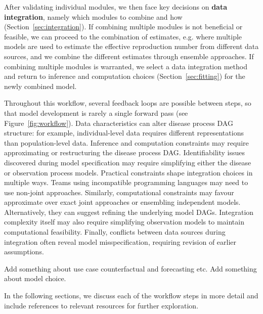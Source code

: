\documentclass{article}
\begin{document}
After validating individual modules, we then face key decisions on \textbf{data integration}, namely which modules to combine and how  (Section~\ref{sec:integration}). If combining multiple modules is not beneficial or feasible, we can proceed to the combination of estimates, e.g. where multiple models are used to estimate the effective reproduction number from different data sources, and we combine the different estimates through ensemble approaches. If combining multiple modules is warranted, we select a data integration method and return to inference and computation choices (Section~\ref{sec:fitting}) for the newly combined model.

Throughout this workflow, several feedback loops are possible between steps, so that model development is rarely a single forward pass (see Figure~\ref{fig:workflow}). 
Data characteristics can alter disease process \ac{DAG} structure: for example, individual-level data requires different representations than population-level data. 
Inference and computation constraints may require approximating or restructuring the disease process \ac{DAG}.
Identifiability issues discovered during model specification may require simplifying either the disease or observation process models. 
Practical constraints shape integration choices in multiple ways. 
Teams using incompatible programming languages may need to use non-joint approaches. 
Similarly, computational constraints may favour approximate over exact joint approaches or ensembling independent models.
Alternatively, they can suggest refining the underlying model \ac{DAG}s.
Integration complexity itself may also require simplifying observation models to maintain computational feasibility. 
Finally, conflicts between data sources during integration often reveal model misspecification, requiring revision of earlier assumptions.

Add something about use case counterfactual and forecasting etc.
Add something about model choice.

In the following sections, we discuss each of the workflow steps in more detail and include references to relevant resources for further exploration.
\end{document}

